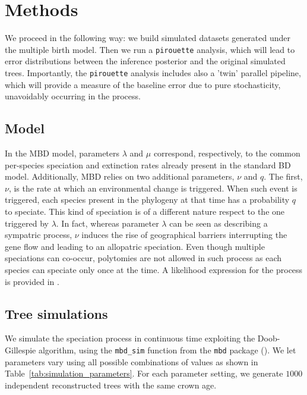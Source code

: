 \section{Methods}

We proceed in the following way: we build simulated datasets generated under the multiple birth model. Then we run a \verb;pirouette; analysis, which will lead to error distributions between the inference posterior and the original simulated trees. Importantly, the \verb;pirouette; analysis includes also a 'twin' parallel pipeline, which will provide a measure of the baseline error due to pure stochasticity, unavoidably occurring in the process.

\subsection{Model}

In the MBD model, parameters $\lambda$ and $\mu$ correspond, respectively, to the common per-species speciation and extinction rates already present in the standard BD model. 
Additionally, MBD relies on two additional parameters, $\nu$ and $q$. 
The first, $\nu$, is the rate at which an environmental change is triggered.
When such event is triggered, each species present in the phylogeny at that time has a probability $q$ to speciate.
This kind of speciation is of a different nature respect to the one triggered by $\lambda$. In fact, whereas parameter $\lambda$ can be seen as describing a sympatric process, $\nu$ induces the rise of geographical barriers interrupting the gene flow  and leading to an allopatric speciation.
Even though multiple speciations can co-occur, polytomies are not allowed in such process as each species can speciate only once at the time.
A likelihood expression for the process is provided in \cite{mbd}.

\subsection{Tree simulations}

We simulate the speciation process in continuous time exploiting the Doob-Gillespie algorithm, using the \verb;mbd_sim; function from the \verb;mbd; package (\citep{mbd}).
We let parameters vary using all possible combinations of values as shown in Table~\ref{tab:simulation_parameters}.
For each parameter setting, we generate $1000$ independent reconstructed trees with the same crown age.

